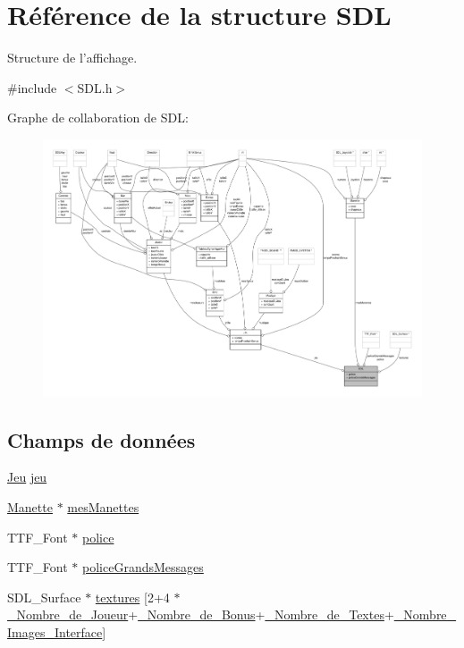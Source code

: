 \hypertarget{structSDL}{\section{Référence de la structure S\-D\-L}
\label{structSDL}
}


Structure de l'affichage.  




{\ttfamily \#include $<$S\-D\-L.\-h$>$}



Graphe de collaboration de S\-D\-L\-:\nopagebreak
\begin{figure}[H]
\begin{center}
\leavevmode
\includegraphics[width=350pt]{structSDL__coll__graph}
\end{center}
\end{figure}
\subsection*{Champs de données}
\begin{DoxyCompactItemize}
\item 
\hyperlink{structJeu}{Jeu} \hyperlink{structSDL_aed6e34a843f7e278abbc6401e7a86748}{jeu}
\item 
\hyperlink{structManette}{Manette} $\ast$ \hyperlink{structSDL_ace23bf8418b8f58e086b6e608e9d0ba0}{mes\-Manettes}
\item 
T\-T\-F\-\_\-\-Font $\ast$ \hyperlink{structSDL_a1ad36295e29f111c716ccdb0e7265a4e}{police}
\item 
T\-T\-F\-\_\-\-Font $\ast$ \hyperlink{structSDL_a6b8f503288d42f8dbe8bb3ff97629404}{police\-Grands\-Messages}
\item 
S\-D\-L\-\_\-\-Surface $\ast$ \hyperlink{structSDL_a7a8c5288d76cf72d0f5ba90ef4046d58}{textures} \mbox{[}2+4 $\ast$\hyperlink{Constantes_8h_a505b3b803482fbd73a5eafac78db730f}{\-\_\-\-Nombre\-\_\-de\-\_\-\-Joueur}+\hyperlink{Constantes_8h_af4e31715ab308023d6200e64b86b9946}{\-\_\-\-Nombre\-\_\-de\-\_\-\-Bonus}+\hyperlink{Constantes_8h_a64872e3ddf1efd6847f90dbcb0ed21ce}{\-\_\-\-Nombre\-\_\-de\-\_\-\-Textes}+\hyperlink{Constantes_8h_a228aa6ff538af983b44e972225d962b9}{\-\_\-\-Nombre\-\_\-\-Images\-\_\-\-Interface}\mbox{]}
\end{DoxyCompactItemize}


